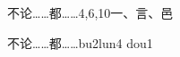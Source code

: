 \begin{entry}{不论……都……}{4,6,10}{⼀、⾔、⾢}
  \begin{phonetics}{不论……都……}{bu2lun4 dou1}
  \end{phonetics}
\end{entry}
